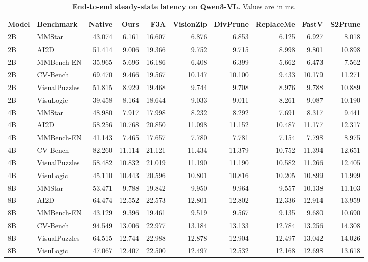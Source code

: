 \documentclass[10pt,a4paper,landscape]{article}
\begin{document}
\clearpage
\begin{table}[!ht]\centering
\caption{\textbf{End-to-end steady-state latency on Qwen3-VL.} Values are in ms.}
\small
\begin{tabular}{@{}llrrrrrrrr@{}}\toprule
Model & Benchmark & Native & Ours & F3A & VisionZip & DivPrune & ReplaceMe & FastV & S2Prune\\\midrule
2B & MMStar & 43.074 & 6.161 & 16.607 & 6.876 & 6.853 & 6.125 & 6.927 & 8.018\\
2B & AI2D & 51.414 & 9.006 & 19.366 & 9.752 & 9.715 & 8.998 & 9.801 & 10.898\\
2B & MMBench-EN & 35.965 & 5.696 & 16.186 & 6.408 & 6.399 & 5.662 & 6.473 & 7.562\\
2B & CV-Bench & 69.470 & 9.466 & 19.567 & 10.147 & 10.100 & 9.433 & 10.179 & 11.271\\
2B & VisualPuzzles & 51.815 & 8.929 & 19.468 & 9.744 & 9.708 & 8.976 & 9.788 & 10.889\\
2B & VisuLogic & 39.458 & 8.164 & 18.644 & 9.033 & 9.011 & 8.261 & 9.087 & 10.190\\
\midrule
4B & MMStar & 48.980 & 7.917 & 17.998 & 8.232 & 8.292 & 7.691 & 8.317 & 9.441\\
4B & AI2D & 58.256 & 10.768 & 20.850 & 11.098 & 11.152 & 10.487 & 11.177 & 12.317\\
4B & MMBench-EN & 41.143 & 7.465 & 17.657 & 7.780 & 7.781 & 7.154 & 7.798 & 8.975\\
4B & CV-Bench & 82.260 & 11.114 & 21.121 & 11.434 & 11.379 & 10.752 & 11.394 & 12.651\\
4B & VisualPuzzles & 58.482 & 10.832 & 21.019 & 11.190 & 11.190 & 10.582 & 11.266 & 12.405\\
4B & VisuLogic & 45.110 & 10.443 & 20.596 & 10.801 & 10.816 & 10.205 & 10.899 & 11.999\\
\midrule
8B & MMStar & 53.471 & 9.788 & 19.842 & 9.950 & 9.964 & 9.557 & 10.138 & 11.103\\
8B & AI2D & 64.474 & 12.552 & 22.573 & 12.801 & 12.802 & 12.336 & 12.914 & 13.959\\
8B & MMBench-EN & 43.129 & 9.396 & 19.461 & 9.519 & 9.567 & 9.135 & 9.680 & 10.690\\
8B & CV-Bench & 94.549 & 13.006 & 22.977 & 13.184 & 13.133 & 12.784 & 13.256 & 14.308\\
8B & VisualPuzzles & 64.515 & 12.744 & 22.988 & 12.878 & 12.904 & 12.497 & 13.042 & 14.026\\
8B & VisuLogic & 47.067 & 12.407 & 22.500 & 12.497 & 12.532 & 12.168 & 12.698 & 13.618\\

\end{tabular}
\end{table}
\end{document}
